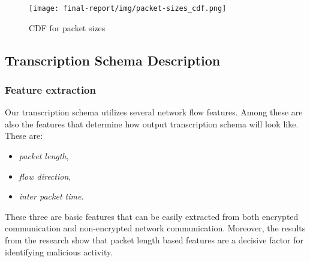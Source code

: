 \documentclass{article}
\begin{document}
\begin{figure}[h!]
    \centering
    \texttt{[image: final-report/img/packet-sizes\_cdf.png]}
    \caption{CDF for packet sizes}
    \label{fig-cdf-packet-sizes}
\end{figure}



\subsection{Transcription Schema Description}\label{sec-schema}

\subsubsection{Feature extraction}

Our transcription schema utilizes several network flow features. Among these are also the features that determine how output transcription schema will look like. These are:

\begin{itemize}
    \item \textit{packet length},
    \item \textit{flow direction},
    \item \textit{inter packet time}.
\end{itemize}

These three are basic features that can be easily extracted from both encrypted communication and non-encrypted network communication. Moreover, the results from the research \cite{meghdouri2018analysis} show that packet length based features are a decisive factor for identifying malicious activity.



\end{document}
